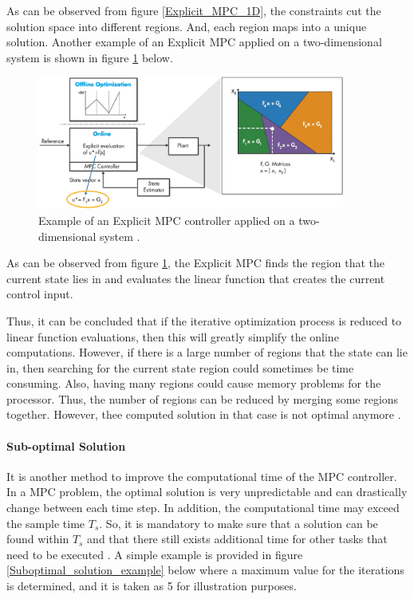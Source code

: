 \documentclass{thesisreport}
\begin{document}
\noindent As can be observed from figure \ref{Explicit_MPC_1D}, the constraints cut the solution space into different regions. And, each region maps into a unique solution.
Another example of an Explicit MPC applied on a two-dimensional system is shown in figure \ref{Explicit_MPC_2D} below. 

\newpage

\begin{figure}[h]
\centering
\includegraphics[width=0.9\textwidth]{Images/Control/Explicit_MPC_b}
\caption{Example of an Explicit MPC controller applied on a two-dimensional system \cite{MathWorks2018_new}.}
\label{Explicit_MPC_2D}
\end{figure}

\noindent As can be observed from figure \ref{Explicit_MPC_2D}, the Explicit MPC finds the  region that the current state lies in and evaluates the linear function that creates the current control input.

\noindent Thus, it can be concluded that if the iterative optimization process is reduced to linear function evaluations, then this will greatly simplify the online computations. However, if there is a large number of regions that the state can lie in, then searching for the current state region could sometimes be time consuming. Also, having many regions could cause memory problems for the processor. Thus, the number of regions can be reduced by merging some regions together. However, thee computed solution in that case is not optimal anymore \cite{Hovland2008}.

\paragraph{Sub-optimal Solution}
It is another method to improve the computational time of the MPC controller. In a MPC problem, the optimal solution is very unpredictable and can drastically change between each time step. In addition, the computational time may exceed the sample time $T_s$. So, it is mandatory to make sure that a solution can be found within $T_s$ and that there still exists additional time for other tasks that need to be executed \cite{Gulez2014}. A simple example is provided in figure \ref{Suboptimal_solution_example} below where a maximum value for the iterations is determined, and it is taken as 5 for illustration purposes. 
\end{document}
